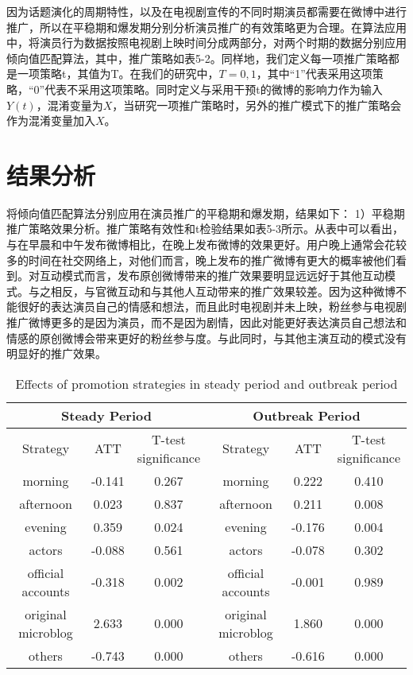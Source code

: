 因为话题演化的周期特性，以及在电视剧宣传的不同时期演员都需要在微博中进行推广，所以在平稳期和爆发期分别分析演员推广的有效策略更为合理。在算法应用中，将演员行为数据按照电视剧上映时间分成两部分，对两个时期的数据分别应用倾向值匹配算法，其中，推广策略如表5-2。同样地，我们定义每一项推广策略都是一项策略t，其值为T。在我们的研究中，$T={0,1}$，其中“1”代表采用这项策略，“0”代表不采用这项策略。同时定义与采用干预t的微博的影响力作为输入$Y(t)$，混淆变量为$X$，当研究一项推广策略时，另外的推广模式下的推广策略会作为混淆变量加入$X$。

\section{结果分析}
将倾向值匹配算法分别应用在演员推广的平稳期和爆发期，结果如下：
1）平稳期推广策略效果分析。推广策略有效性和t检验结果如表5-3所示。从表中可以看出，与在早晨和中午发布微博相比，在晚上发布微博的效果更好。用户晚上通常会花较多的时间在社交网络上，对他们而言，晚上发布的推广微博有更大的概率被他们看到。对互动模式而言，发布原创微博带来的推广效果要明显远远好于其他互动模式。与之相反，与官微互动和与其他人互动带来的推广效果较差。因为这种微博不能很好的表达演员自己的情感和想法，而且此时电视剧并未上映，粉丝参与电视剧推广微博更多的是因为演员，而不是因为剧情，因此对能更好表达演员自己想法和情感的原创微博会带来更好的粉丝参与度。与此同时，与其他主演互动的模式没有明显好的推广效果。

\begin{table*}[!htbp]
\centering
\caption{Effects of promotion strategies in steady period and outbreak period}
\begin{tabular}{|c|c|c|c|c|c|} \hline
\multicolumn{3}{|c}{Steady Period}& \multicolumn{3}{|c|}{Outbreak Period}\\ \hline
Strategy &\hfil ATT & \tabincell{c}{T-test\\significance} & Strategy &\hfil ATT & \tabincell{c}{T-test\\significance}\\ \hline
morning & -0.141 & 0.267& morning & 0.222 & 0.410\\%
afternoon & 0.023 & 0.837 & afternoon & 0.211 & 0.008\\%
evening & 0.359 & 0.024 & evening & -0.176 & 0.004\\ \hline
actors & -0.088 & 0.561 &  actors & -0.078 & 0.302\\
official accounts & -0.318 & 0.002 & official accounts & -0.001 & 0.989\\%
original microblog& 2.633 & 0.000 & original microblog& 1.860 & 0.000\\
others & -0.743 & 0.000 & others & -0.616 & 0.000\\ \hline
\end{tabular}
\end{table*}

